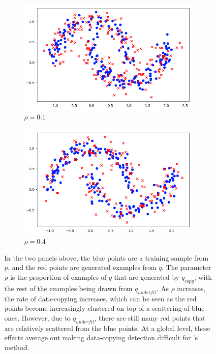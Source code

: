 \begin{figure}[ht]
	\begin{subfigure}{0.45\textwidth}\includegraphics[width=\linewidth]{rho1.png}\caption{$\rho = 0.1$}
	\end{subfigure}\hspace*{\fill}
	\begin{subfigure}{0.45\textwidth}
	\includegraphics[width=\linewidth]{rho4.png}\caption{$\rho = 0.4$}
	\end{subfigure}
	\caption{In the two panels above, the blue points are a training sample from $p$, and the red points are generated examples from $q$. The parameter $\rho$ is the proportion of examples of $q$ that are generated by $q_{copy}$, with the rest of the examples being drawn from $q_{underfit}$. As $\rho$ increases, the rate of data-copying increases, which can be seen as the red points become increasingly clustered on top of a scattering of blue ones. However, due to $q_{underfit}$, there are still many red points that are relatively scattered from the blue points. At a global level, these effects average out making data-copying detection difficult for \cite{MCD2020}'s method.}
	
	\label{fig:halfmoons}
\end{figure}


